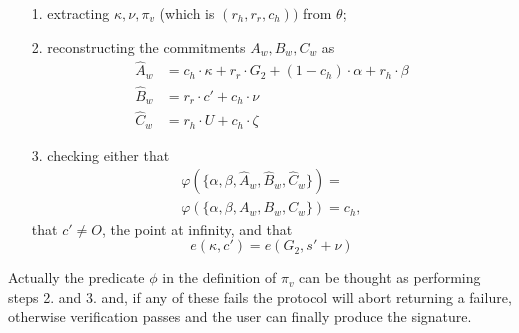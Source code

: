 \documentclass[twocolumn]{article}
\begin{document}
\begin{itemize}
    \item[1.] extracting $\kappa, \nu, \pi_v$ (which is $(r_h,r_r, c_h))$ from $\theta$;
    \item[2.] reconstructing the commitments $A_w, B_w, C_w$ as
    \begin{align*}
        \widehat{A}_w &= c_h\cdot \kappa + r_r\cdot G_2 + (1 - c_h) \cdot\alpha + r_h \cdot \beta \\
        \widehat{B}_w &= r_r\cdot c' + c_h\cdot \nu \\
        \widehat{C}_w &= r_h\cdot U + c_h\cdot \zeta
    \end{align*}
    \item[3.] checking either that
    \begin{multline}\label{challenge pi_v}  \varphi(\{\alpha,\beta,\widehat{A}_w,\widehat{B}_w,\widehat{C}_w\}) = \\ \varphi(\{\alpha,\beta,A_w,B_w,C_w\}) = c_h,
    \end{multline}
    that $c' \ne O$, the point at infinity, and that
    \begin{equation}\label{miller}
    e(\kappa, c') = e(G_2, s' + \nu)
    \end{equation}
    \end{itemize}
Actually the predicate $\phi$ in the definition of $\pi_v$ can be thought as performing steps 2. and 3. and, if any of these fails the protocol will abort returning a failure, otherwise verification passes and the user can finally produce the signature.\\
\end{document}
